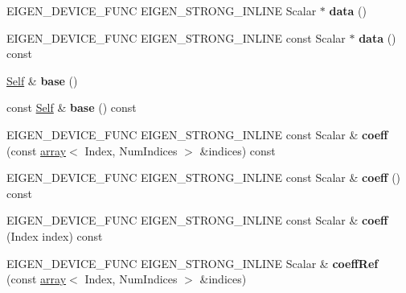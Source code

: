 \begin{DoxyCompactItemize}
E\+I\+G\+E\+N\+\_\+\+D\+E\+V\+I\+C\+E\+\_\+\+F\+U\+NC E\+I\+G\+E\+N\+\_\+\+S\+T\+R\+O\+N\+G\+\_\+\+I\+N\+L\+I\+NE Scalar $\ast$ {\bfseries data} ()
\item 
\mbox{\label{class_eigen_1_1_tensor_a1388805b72e27eef98efcb3192707ad1}} 
E\+I\+G\+E\+N\+\_\+\+D\+E\+V\+I\+C\+E\+\_\+\+F\+U\+NC E\+I\+G\+E\+N\+\_\+\+S\+T\+R\+O\+N\+G\+\_\+\+I\+N\+L\+I\+NE const Scalar $\ast$ {\bfseries data} () const
\item 
\mbox{\label{class_eigen_1_1_tensor_a49013cff6ae8eb8ac7c3dc602fe5293c}} 
\hyperlink{class_eigen_1_1_tensor}{Self} \& {\bfseries base} ()
\item 
\mbox{\label{class_eigen_1_1_tensor_a517c7806e6e10d3a7adba81ee4dda3c8}} 
const \hyperlink{class_eigen_1_1_tensor}{Self} \& {\bfseries base} () const
\item 
\mbox{\label{class_eigen_1_1_tensor_a7dfc391a1418c82a8ca7d73da9908ffb}} 
E\+I\+G\+E\+N\+\_\+\+D\+E\+V\+I\+C\+E\+\_\+\+F\+U\+NC E\+I\+G\+E\+N\+\_\+\+S\+T\+R\+O\+N\+G\+\_\+\+I\+N\+L\+I\+NE const Scalar \& {\bfseries coeff} (const \hyperlink{class_eigen_1_1array}{array}$<$ Index, Num\+Indices $>$ \&indices) const
\item 
\mbox{\label{class_eigen_1_1_tensor_ae81c979a82b4c82f31c5212056a2df97}} 
E\+I\+G\+E\+N\+\_\+\+D\+E\+V\+I\+C\+E\+\_\+\+F\+U\+NC E\+I\+G\+E\+N\+\_\+\+S\+T\+R\+O\+N\+G\+\_\+\+I\+N\+L\+I\+NE const Scalar \& {\bfseries coeff} () const
\item 
\mbox{\label{class_eigen_1_1_tensor_a147f4271e2dd043eb6692a17f6dd1590}} 
E\+I\+G\+E\+N\+\_\+\+D\+E\+V\+I\+C\+E\+\_\+\+F\+U\+NC E\+I\+G\+E\+N\+\_\+\+S\+T\+R\+O\+N\+G\+\_\+\+I\+N\+L\+I\+NE const Scalar \& {\bfseries coeff} (Index index) const
\item 
\mbox{\label{class_eigen_1_1_tensor_a5cffcaf8927b06f8e0d1c84eda3c53da}} 
E\+I\+G\+E\+N\+\_\+\+D\+E\+V\+I\+C\+E\+\_\+\+F\+U\+NC E\+I\+G\+E\+N\+\_\+\+S\+T\+R\+O\+N\+G\+\_\+\+I\+N\+L\+I\+NE Scalar \& {\bfseries coeff\+Ref} (const \hyperlink{class_eigen_1_1array}{array}$<$ Index, Num\+Indices $>$ \&indices)
\item 

\end{DoxyCompactItemize}
